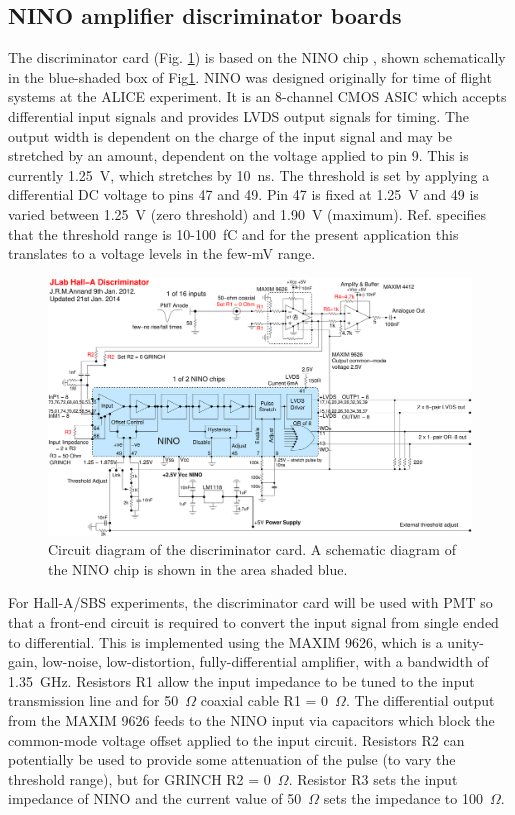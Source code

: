\documentclass{article}
\begin{document}
\subsection{NINO amplifier discriminator boards }
The discriminator card (Fig. \ref{fig:nino-schematic}) is based on
the NINO chip \cite{NINO}, shown schematically in the blue-shaded
box of Fig\ref{fig:nino-schematic}. NINO was designed originally
for time of flight systems at the ALICE experiment. It is an 8-channel
CMOS ASIC which accepts differential input signals and provides LVDS
output signals for timing. The output width is dependent on the charge
of the input signal and may be stretched by an amount, dependent on
the voltage applied to pin 9. This is currently 1.25~V, which stretches
by 10~ns. The threshold is set by applying a differential DC voltage
to pins 47 and 49. Pin 47 is fixed at 1.25~V and 49 is varied between
1.25~V (zero threshold) and 1.90~V (maximum). Ref. \cite{NINO}
specifies that the threshold range is 10-100~fC and for the present
application this translates to a voltage levels in the few-mV range.
\begin{figure}[h]
\includegraphics[width=1\columnwidth]{NINO/ReportJan14/CherenkovNINO-4}

\protect\caption{\label{fig:nino-schematic}Circuit diagram of the discriminator card.
A schematic diagram of the NINO chip is shown in the area shaded blue.}


\end{figure}
For Hall-A/SBS experiments, the discriminator card will be used with
PMT so that a front-end circuit is required to convert the input signal
from single ended to differential. This is implemented using the MAXIM
9626, which is a unity-gain, low-noise, low-distortion, fully-differential
amplifier, with a bandwidth of 1.35~GHz. Resistors R1 allow the input
impedance to be tuned to the input transmission line and for 50~$\Omega$
coaxial cable R1 = 0~$\Omega.$ The differential output from the
MAXIM 9626 feeds to the NINO input via capacitors which block the
common-mode voltage offset applied to the input circuit. Resistors
R2 can potentially be used to provide some attenuation of the pulse
(to vary the threshold range), but for GRINCH R2 = 0~$\Omega.$ Resistor
R3 sets the input impedance of NINO and the current value of 50~$\Omega$
sets the impedance to 100~$\Omega.$
\end{document}

